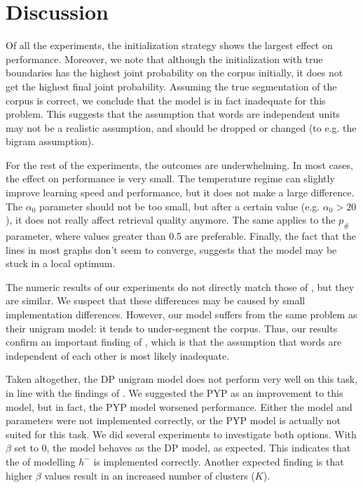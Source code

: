 \section{Discussion}

Of all the experiments, the initialization strategy shows the largest effect on performance. Moreover, we note that although the initialization with true boundaries has the highest joint probability on the corpus initially, it does not get the highest final joint probability. Assuming the true segmentation of the corpus is correct, we conclude that the model is in fact inadequate for this problem. This suggests that the assumption that words are independent units may not be a realistic assumption, and should be dropped or changed (to e.g. the bigram assumption).

For the rest of the experiments, the outcomes are underwhelming. In most cases, the effect on performance is very small. The temperature regime can slightly improve learning speed and performance, but it does not make a large difference. The $\alpha_0$ parameter should not be too small, but after a certain value (e.g. $\alpha_0 > 20$), it does not really affect retrieval quality anymore. The same applies to the $p_\#$ parameter, where values greater than 0.5 are preferable. Finally, the fact that the lines in most graphs don't seem to converge, suggests that the model may be stuck in a local optimum.

The numeric results of our experiments do not directly match those of \cite{Goldwater200921}, but they are similar. We suspect that these differences may be caused by small implementation differences. However, our model suffers from the same problem as their unigram model: it tends to under-segment the corpus. Thus, our results confirm an important finding of \cite{Goldwater200921}, which is that the assumption that words are independent of each other is most likely inadequate.

Taken altogether, the DP unigram model does not perform very well on this task, in line with the findings of  \cite{Goldwater200921}. We suggested the PYP as an improvement to this model, but in fact, the PYP model worsened performance. Either the model and parameters were not implemented correctly, or the PYP model is actually not suited for this task. We did several experiments to investigate both options. With $\beta$ set to 0, the model behaves as the DP model, as expected. This indicates that the of modelling $h^-$ is implemented correctly. Another expected finding is that higher $\beta$ values result in an increased number of clusters ($K$). 

